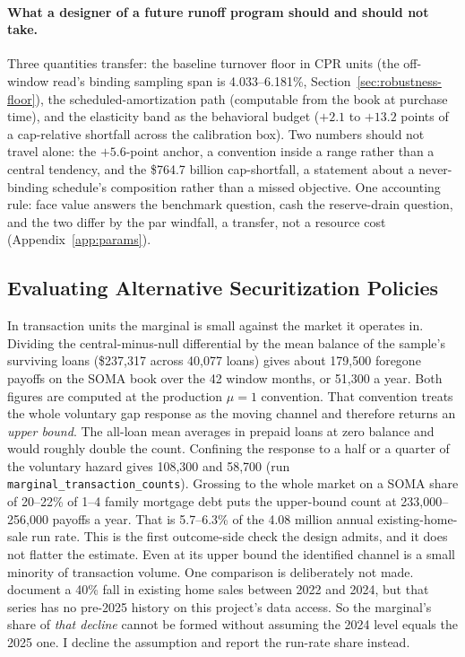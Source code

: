 \documentclass[12pt]{article}
\begin{document}
\paragraph{What a designer of a future runoff program should and should not take.} Three quantities transfer: the baseline turnover floor in CPR units (the off-window read's binding sampling span is 4.033--6.181\%, Section~\ref{sec:robustness-floor}), the scheduled-amortization path (computable from the book at purchase time), and the elasticity band as the behavioral budget ($+2.1$ to $+13.2$ points of a cap-relative shortfall across the calibration box). Two numbers should not travel alone: the $+5.6$-point anchor, a convention inside a range rather than a central tendency, and the \$764.7 billion cap-shortfall, a statement about a never-binding schedule's composition rather than a missed objective. One accounting rule: face value answers the benchmark question, cash the reserve-drain question, and the two differ by the par windfall, a transfer, not a resource cost (Appendix~\ref{app:params}).

\subsection{Evaluating Alternative Securitization Policies}\label{sec:discussion-policy}
In transaction units the marginal is small against the market it operates in. Dividing the central-minus-null differential by the mean balance of the sample's surviving loans (\$237{,}317 across 40{,}077 loans) gives about 179{,}500 foregone payoffs on the SOMA book over the 42 window months, or 51{,}300 a year. Both figures are computed at the production $\mu = 1$ convention. That convention treats the whole voluntary gap response as the moving channel and therefore returns an \emph{upper bound}. The all-loan mean averages in prepaid loans at zero balance and would roughly double the count. Confining the response to a half or a quarter of the voluntary hazard gives 108{,}300 and 58{,}700 (run \texttt{marginal\_transaction\_counts}). Grossing to the whole market on a SOMA share of 20--22\% of 1--4 family mortgage debt puts the upper-bound count at 233{,}000--256{,}000 payoffs a year. That is 5.7--6.3\% of the 4.08 million annual existing-home-sale run rate. This is the first outcome-side check the design admits, and it does not flatter the estimate. Even at its upper bound the identified channel is a small minority of transaction volume. One comparison is deliberately not made. \citet{fonseca2026} document a 40\% fall in existing home sales between 2022 and 2024, but that series has no pre-2025 history on this project's data access. So the marginal's share of \emph{that decline} cannot be formed without assuming the 2024 level equals the 2025 one. I decline the assumption and report the run-rate share instead.
\end{document}
